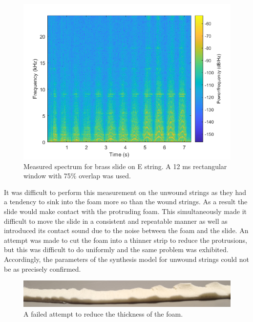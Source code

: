 \documentclass[../main.tex]{subfiles}
\begin{document}
\begin{figure}[h]
    \centering
    \includegraphics[scale=.65]{./images/plots/ContactNoiseEBrass.png}
    \caption{Measured spectrum for brass slide on E string. A 12 ms rectangular window with 75\% overlap was used.}
    \label{fig:ContactNoiseEBrass}
\end{figure}

It was difficult to perform this measurement on the unwound strings as they had a tendency to sink into the foam more so than the wound strings. As a result the slide would make contact with the protruding foam. This simultaneously made it difficult to move the slide in a consistent and repeatable manner as well as introduced its contact sound due to the noise between the foam and the slide. An attempt was made to cut the foam into a thinner strip to reduce the protrusions, but this was difficult to do uniformly and the same problem was exhibited. Accordingly, the parameters of the synthesis model for unwound strings could not be as precisely confirmed.

\begin{figure}[h]
    \centering
    \includegraphics[scale=.15]{./images/pictures/CutFoam.png}
    \caption{A failed attempt to reduce the thickness of the foam.}
    \label{fig:CutFoam}
\end{figure}
\end{document}
